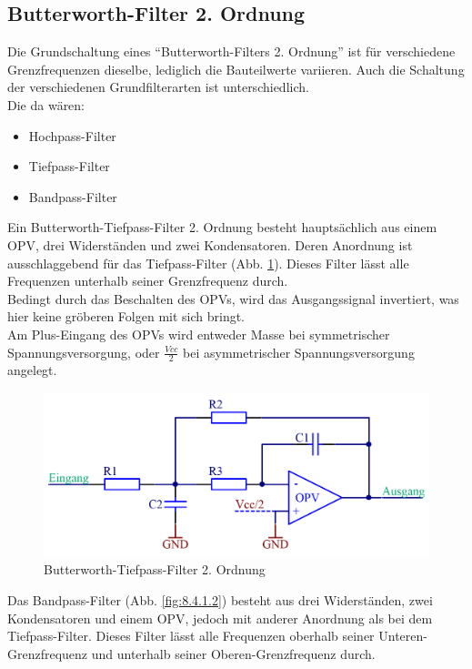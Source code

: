 \subsection{Butterworth-Filter 2. Ordnung}\label{subsec:8.4.1}
Die Grundschaltung eines \enquote{Butterworth-Filters 2. Ordnung} ist für verschiedene Grenzfrequenzen dieselbe, lediglich die Bauteilwerte variieren.
Auch die Schaltung der verschiedenen Grundfilterarten ist unterschiedlich. \\
Die da wären: 
\begin{itemize}
	\item Hochpass-Filter
	\item Tiefpass-Filter
	\item Bandpass-Filter
\end{itemize}
Ein Butterworth-Tiefpass-Filter 2. Ordnung besteht hauptsächlich aus einem OPV, drei Widerständen und zwei Kondensatoren.
Deren Anordnung ist ausschlaggebend für das Tiefpass-Filter (Abb. \ref{fig:8.4.1.1}).
Dieses Filter lässt alle Frequenzen unterhalb seiner Grenzfrequenz durch.\\ 
Bedingt durch das Beschalten des OPVs, wird das Ausgangssignal invertiert, was hier keine gröberen Folgen mit sich bringt.\\ 
Am Plus-Eingang des OPVs wird entweder Masse bei symmetrischer Spannungsversorgung, oder $\frac{Vcc}{2}$ bei asymmetrischer Spannungsversorgung angelegt.
\begin{figure} [H]
	\centering
	\includegraphics[width=1\textwidth]{img/Print3/TPFilterButterworth2Ordnung.PNG}
	\caption{Butterworth-Tiefpass-Filter 2. Ordnung}
	\label {fig:8.4.1.1}
\end{figure}
Das Bandpass-Filter (Abb. \ref{fig:8.4.1.2}) besteht aus drei Widerständen, zwei Kondensatoren und einem OPV, jedoch mit anderer Anordnung als bei dem Tiefpass-Filter.
Dieses Filter lässt alle Frequenzen oberhalb seiner Unteren-Grenzfrequenz und unterhalb seiner Oberen-Grenzfrequenz durch.

